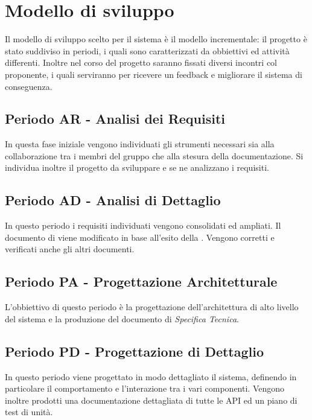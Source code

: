 \documentclass[./PianoDiProgetto.tex]{subfiles}
\begin{document}
  \section{Modello di sviluppo}

  Il modello di sviluppo scelto per il sistema è il modello incrementale: il
  progetto è stato suddiviso in periodi, i quali sono caratterizzati da
  obbiettivi ed attività differenti. Inoltre nel corso del progetto saranno
  fissati diversi incontri col proponente, i quali serviranno per ricevere un
  feedback e migliorare il sistema di conseguenza.

  \subsection{Periodo AR - Analisi dei Requisiti}

  In questa fase iniziale vengono individuati gli strumenti necessari sia alla
  collaborazione tra i membri del gruppo che alla stesura della documentazione.
  Si individua inoltre il progetto da sviluppare e se ne analizzano i requisiti.

  \subsection{Periodo AD - Analisi di Dettaglio}

  In questo periodo i requisiti individuati vengono consolidati ed ampliati. Il
  documento di \ARdoc viene modificato in base all'esito
  della \RR. Vengono corretti e verificati anche gli altri documenti.

  \subsection{Periodo PA - Progettazione Architetturale}

  L'obbiettivo di questo periodo è la progettazione dell'architettura di alto
  livello del sistema e la produzione del documento di \textit{Specifica Tecnica}.

  \subsection{Periodo PD - Progettazione di Dettaglio}

  In questo periodo viene progettato in modo dettagliato il sistema, definendo
  in particolare il comportamento e l'interazione tra i vari componenti. Vengono
  inoltre prodotti una documentazione dettagliata di tutte le API ed un piano
  di test di unità.
\end{document}
